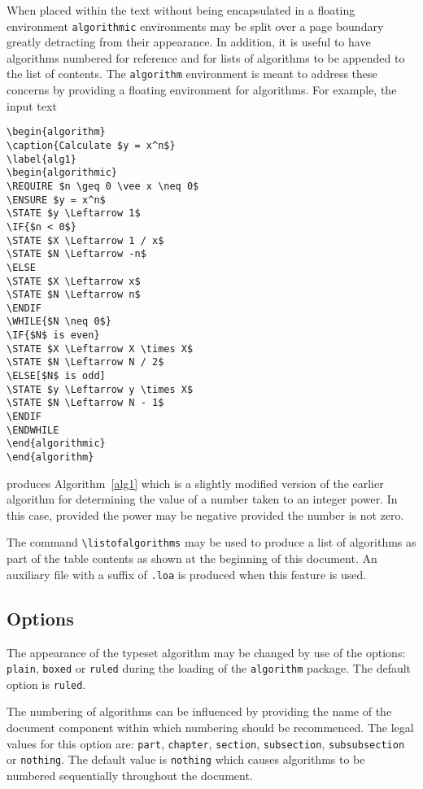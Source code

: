 \documentclass{article}
\begin{document}
When placed within the text without being encapsulated in a floating
environment \texttt{algorithmic} environments may be split over a page
boundary greatly detracting from their appearance.
In addition, it is useful to have algorithms numbered for reference
and for lists of algorithms to be appended to the list of contents.
The \texttt{algorithm} environment is meant to address these concerns
by providing a floating environment for algorithms.
For example, the input text
\begin{verbatim}
\begin{algorithm}
\caption{Calculate $y = x^n$}
\label{alg1}
\begin{algorithmic}
\REQUIRE $n \geq 0 \vee x \neq 0$
\ENSURE $y = x^n$
\STATE $y \Leftarrow 1$
\IF{$n < 0$}
\STATE $X \Leftarrow 1 / x$
\STATE $N \Leftarrow -n$
\ELSE
\STATE $X \Leftarrow x$
\STATE $N \Leftarrow n$
\ENDIF
\WHILE{$N \neq 0$}
\IF{$N$ is even}
\STATE $X \Leftarrow X \times X$
\STATE $N \Leftarrow N / 2$
\ELSE[$N$ is odd]
\STATE $y \Leftarrow y \times X$
\STATE $N \Leftarrow N - 1$
\ENDIF
\ENDWHILE
\end{algorithmic}
\end{algorithm}
\end{verbatim}
produces Algorithm~\ref{alg1} which is a slightly modified version of
the earlier algorithm for determining the value of a number taken to an
integer power.
In this case, provided the power may be negative provided the number is
not zero.

The command \verb+\listofalgorithms+ may be used to produce a list
of algorithms as part of the table contents as shown at the beginning of
this document.
An auxiliary file with a suffix of \texttt{.loa} is produced when this
feature is used.

\subsection{Options}

The appearance of the typeset algorithm may be changed by use of the
options: \texttt{plain}, \texttt{boxed} or \texttt{ruled} during the
loading of the \texttt{algorithm} package.
The default option is \texttt{ruled}.

The numbering of algorithms can be influenced by providing the name of
the document component within which numbering should be recommenced.
The legal values for this option are: \texttt{part}, \texttt{chapter},
\texttt{section}, \texttt{subsection}, \texttt{subsubsection}
or \texttt{nothing}.
The default value is \texttt{nothing} which causes algorithms to be
numbered sequentially throughout the document.
\end{document}
